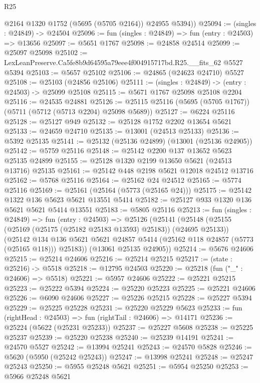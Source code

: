 \begin{lexlean}{R25}
\begin{coremodule}
        @2164
        @1320
        @1752
        (@5695 (@5705 @2164))
        @24955
        @5394))
@25094 := (singles : @24849) -> @24504
@25096 := fun (singles : @24849) => fun (entry : @24503) => @13656
@25097 := @5651 @1767
@25098 := @24858 @24514
@25099 := @25097 @25098
@25102 := LexLeanPreserve.Ca5fe8b9d64595a79eee4f004915717bd.R25.__fits_62 @5527 @5394
@25103 := @5657 @25102
@25106 := @24865 (@24623 @24710) @5527
@25108 := @25103 (@24856 @25106)
@25111 := (singles : @24849) -> (entry : @24503) -> @25099 @25108
@25115 := @5671 @1767 @25098 @25108 @2204
@25116 := @24535 @24881
@25126 := @25115 @25116 (@5695 (@5705 @1767)) (@5711 (@5712 (@5713 @2204) @25098 @5689))
@25127 := @6224 @25116
@25128 := @25127 @949
@25132 := @25128 @1752 @2202 @13654 @5621
@25133 := @24659 @24710
@25135 := @13001 (@24513 @25133)
@25136 := @5392 @25135
@25141 := @25132 (@25136 @24899) (@13001 (@25136 @24905))
@25142 := @5759 @25116
@25148 := @25142 @2200 @137 @13652 @5623 @25135 @24899
@25155 := @25128 @1320 @2199 @13650 @5621 (@24513 @13716) @25135
@25161 := @25142 @448 @2198 @5621 @12018 @24512 @13716
@25162 := @5768 @25116
@25164 := @25162 @24 @24512
@25165 := @5774 @25116
@25169 := @25161 (@25164 (@5773 (@25165 @24)))
@25175 := @25142 @1322 @136 @5623 @5621 @13551 @5414
@25182 := @25127 @933 @1320 @136 @5621 @5621 @5414 @13551
@25183 := @5805 @25116
@25213 := fun (singles : @24849) =>
  fun (entry : @24503) =>
  @25126
    (@25141
      (@25148
        (@25155 (@25169 (@25175 (@25182 @25183 @13593) @25183)) (@24695 @25133))
        (@25142
          @134
          @136
          @5621
          @5621
          @24857
          @5414
          (@25162 @118 @24857 (@5773 (@25165 @118)))
          @25183))
      (@13061 @25135 @24905))
@25214 := @5676 @24606
@25215 := @25214 @24606
@25216 := @25214 @25215
@25217 := (state : @25216) -> @5518
@25218 := @12795 @24503
@25220 := @25218 (fun ("_" : @24606) => @5518)
@25221 := @5957 @24606
@25222 := @25221 @25215
@25223 := @25222 @5394
@25224 := @25220 @25223
@25225 := @25221 @24606
@25226 := @6090 @24606
@25227 := @25226 @25215
@25228 := @25227 @5394
@25229 := @25225 @25228
@25231 := @25220 @25229 @5623
@25233 := fun (rightHead : @24503) => fun (rightTail : @24606) => @14171
@25236 := @25224 (@5622 (@25231 @25233))
@25237 := @25227 @5608
@25238 := @25225 @25237
@25239 := @25220 @25238
@25240 := @25239 @14191
@25241 := @24570 @5527
@25242 := @13994 @25241
@25243 := @24570 @5828
@25246 := @5620 (@5950 (@25242 @25243))
@25247 := @13998 @25241
@25248 := @25247 @25243
@25250 := @5955 @25248 @5621
@25251 := @5954 @25250
@25253 := @5966 @25248 @5621

\end{coremodule}
\end{lexlean}
